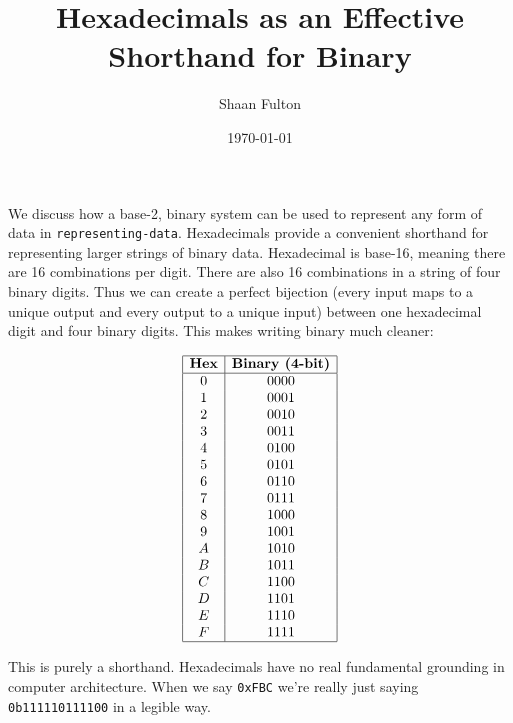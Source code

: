 \documentclass[12pt]{article}
\title{Hexadecimals as an Effective Shorthand for Binary}
\author{Shaan Fulton}
\date{\today}
\begin{document}
\maketitle

We discuss how a base-2, binary system can be used to represent any form of data in \texttt{representing-data}. Hexadecimals provide a convenient shorthand for representing larger strings of binary data. Hexadecimal is base-16, meaning there are 16 combinations per digit. There are also 16 combinations in a string of four binary digits. Thus we can create a perfect bijection (every input maps to a unique output and every output to a unique input) between one hexadecimal digit and four binary digits. This makes writing binary much cleaner:

\[
\begin{array}{|c|c|}
\hline
\textbf{Hex} & \textbf{Binary (4-bit)} \\
\hline
0 & 0000 \\
1 & 0001 \\
2 & 0010 \\
3 & 0011 \\
4 & 0100 \\
5 & 0101 \\
6 & 0110 \\
7 & 0111 \\
8 & 1000 \\
9 & 1001 \\
A & 1010 \\
B & 1011 \\
C & 1100 \\
D & 1101 \\
E & 1110 \\
F & 1111 \\
\hline
\end{array}
\]

This is purely a shorthand. Hexadecimals have no real fundamental grounding in computer architecture. When we say \texttt{0xFBC} we're really just saying \texttt{0b111110111100} in a legible way.
\end{document}
